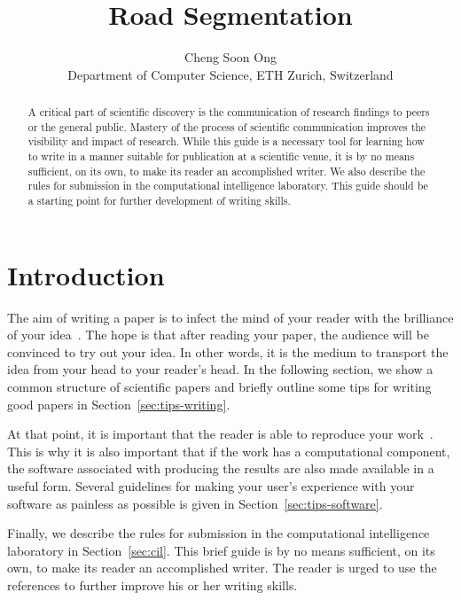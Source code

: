 \documentclass[10pt,conference,compsocconf]{IEEEtran}
\begin{document}
\title{Road Segmentation}

\author{
  Cheng Soon Ong\\
  Department of Computer Science, ETH Zurich, Switzerland
}

\maketitle

\begin{abstract}
  A critical part of scientific discovery is the
  communication of research findings to peers or the general public.
  Mastery of the process of scientific communication improves the
  visibility and impact of research. While this guide is a necessary
  tool for learning how to write in a manner suitable for publication
  at a scientific venue, it is by no means sufficient, on its own, to
  make its reader an accomplished writer. We also describe the rules
  for submission in the computational intelligence laboratory.
  This guide should be a
  starting point for further development of writing skills.
\end{abstract}

\section{Introduction}

The aim of writing a paper is to infect the mind of your reader with
the brilliance of your idea~\cite{jones08}. 
The hope is that after reading your
paper, the audience will be convinced to try out your idea. In other
words, it is the medium to transport the idea from your head to your
reader's head. 
In the following
section, we show a common structure of scientific papers and briefly
outline some tips for writing good papers in
Section~\ref{sec:tips-writing}.

At that
point, it is important that the reader is able to reproduce your
work~\cite{schwab00,wavelab,gentleman05}. This is why it is also
important that if the work has a computational component, the software
associated with producing the results are also made available in a
useful form. Several guidelines for making your user's experience with
your software as painless as possible is given in
Section~\ref{sec:tips-software}.

Finally, we describe the rules for submission in the computational
intelligence laboratory in Section~\ref{sec:cil}. 
This brief guide is by no means sufficient, on its own, to
make its reader an accomplished writer. The reader is urged to use the
references to further improve his or her writing skills.
\end{document}
